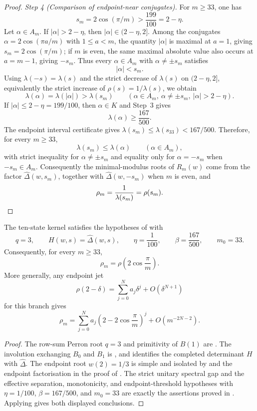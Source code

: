 \begin{proof}
\medskip
\noindent\textit{Step 4 (Comparison of endpoint-near conjugates).}\quad
For \(m\ge33\), one has
\[
  s_m=2\cos(\pi/m)>\frac{199}{100}=2-\eta.
\]
Let \(\alpha\in A_m\). If \(|\alpha|>2-\eta\), then
\(|\alpha|\in(2-\eta,2]\). Among the conjugates
\(\alpha=2\cos(\pi a/m)\) with \(1\le a<m\), the quantity \(|\alpha|\)
is maximal at \(a=1\), giving \(s_m=2\cos(\pi/m)\); if \(m\) is even,
the same maximal absolute value also occurs at \(a=m-1\), giving
\(-s_m\). Thus every \(\alpha\in A_m\) with \(\alpha\neq \pm s_m\)
satisfies
\[
  |\alpha|<s_m.
\]
Using \(\lambda(-s)=\lambda(s)\) and the strict decrease of
\(\lambda(s)\) on \((2-\eta,2]\), equivalently the strict increase of
\(\rho(s)=1/\lambda(s)\), we obtain
\[
  \lambda(\alpha)=\lambda(|\alpha|)>\lambda(s_m)
  \qquad
  (\alpha\in A_m,\ \alpha\neq \pm s_m,\ |\alpha|>2-\eta).
\]
If \(|\alpha|\le 2-\eta=199/100\), then \(\alpha\in K\) and Step~3 gives
\[
  \lambda(\alpha)\ge\frac{167}{500}.
\]
The endpoint interval certificate gives
\(\lambda(s_m)\le \lambda(s_{33})<167/500\). Therefore, for every \(m\ge33\),
\[
  \lambda(s_m)\le \lambda(\alpha)
  \qquad
  (\alpha\in A_m),
\]
with strict inequality for \(\alpha\neq \pm s_m\) and equality only for
\(\alpha=-s_m\) when \(-s_m\in A_m\).
Consequently the minimal-modulus roots of \(R_m(w)\) come from the
factor \(\widehat\Delta(w,s_m)\), together with
\(\widehat\Delta(w,-s_m)\) when \(m\) is even, and
\[
  \rho_m=\frac{1}{\lambda(s_m)}=\rho(s_m). \qedhere
\]

\end{proof}

\begin{corollary}
  \label{cor:sync-endpoint-selection-application}
  The ten-state kernel satisfies the hypotheses of
   with
  \[
    q=3,\qquad
    H(w,s)=\widehat\Delta(w,s),\qquad
    \eta=\frac1{100},\qquad
    \beta=\frac{167}{500},\qquad
    m_0=33.
  \]
  Consequently, for every \(m\ge33\),
  \[
    \rho_m=\rho\!\left(2\cos\frac{\pi}{m}\right).
  \]
  More generally, any endpoint jet
  \[
    \rho(2-\delta)=\sum_{j=0}^N a_j\delta^j+O(\delta^{N+1})
  \]
  for this branch gives
  \[
    \rho_m
    =\sum_{j=0}^N a_j
      \left(2-2\cos\frac{\pi}{m}\right)^j
      +O(m^{-2N-2}).
  \]
\end{corollary}

\begin{proof}
The row-sum Perron root \(q=3\) and primitivity of \(B(1)\) are
. The involution exchanging \(B_0\) and
\(B_1\) is , and
 identifies the completed
determinant \(H\) with \(\widehat\Delta\). The endpoint root
\(w(2)=1/3\) is simple and isolated by
 and the endpoint factorisation in the
proof of . The strict unitary spectral gap and
the effective separation, monotonicity, and endpoint-threshold
hypotheses with \(\eta=1/100\), \(\beta=167/500\), and \(m_0=33\)
are exactly the assertions
proved in . Applying
 gives both displayed
conclusions.
\end{proof}

